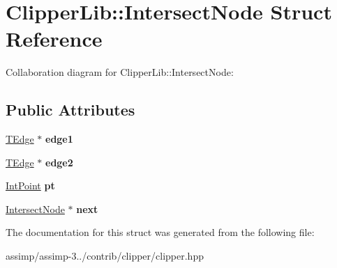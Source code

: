 \hypertarget{struct_clipper_lib_1_1_intersect_node}{\section{Clipper\+Lib\+:\+:Intersect\+Node Struct Reference}
\label{struct_clipper_lib_1_1_intersect_node}
}


Collaboration diagram for Clipper\+Lib\+:\+:Intersect\+Node\+:
\subsection*{Public Attributes}
\begin{DoxyCompactItemize}
\item 
\hypertarget{struct_clipper_lib_1_1_intersect_node_a9ca23b5341d4609ecb24ad7ac5eb6da4}{\hyperlink{struct_clipper_lib_1_1_t_edge}{T\+Edge} $\ast$ {\bfseries edge1}}\label{struct_clipper_lib_1_1_intersect_node_a9ca23b5341d4609ecb24ad7ac5eb6da4}

\item 
\hypertarget{struct_clipper_lib_1_1_intersect_node_ac32451de72e8e929bbb9704b8d330317}{\hyperlink{struct_clipper_lib_1_1_t_edge}{T\+Edge} $\ast$ {\bfseries edge2}}\label{struct_clipper_lib_1_1_intersect_node_ac32451de72e8e929bbb9704b8d330317}

\item 
\hypertarget{struct_clipper_lib_1_1_intersect_node_af24af801ac1e74f9200908dcad88cc30}{\hyperlink{struct_clipper_lib_1_1_int_point}{Int\+Point} {\bfseries pt}}\label{struct_clipper_lib_1_1_intersect_node_af24af801ac1e74f9200908dcad88cc30}

\item 
\hypertarget{struct_clipper_lib_1_1_intersect_node_a6534367f8cc07404d5f19230166f8c78}{\hyperlink{struct_clipper_lib_1_1_intersect_node}{Intersect\+Node} $\ast$ {\bfseries next}}\label{struct_clipper_lib_1_1_intersect_node_a6534367f8cc07404d5f19230166f8c78}

\end{DoxyCompactItemize}


The documentation for this struct was generated from the following file\+:\begin{DoxyCompactItemize}
\item 
assimp/assimp-\/3../contrib/clipper/clipper.\+hpp\end{DoxyCompactItemize}
